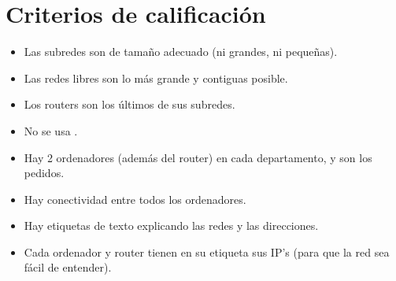 \section{Criterios de calificación}
\begin{itemize}
\item Las subredes son de tamaño adecuado (ni grandes, ni pequeñas).
\item Las redes libres son lo más grande y contiguas posible.
\item Los routers son los últimos de sus subredes.
\item No se usa \texttt{}.
\item Hay 2 ordenadores (además del router) en cada departamento, y son los pedidos.
\item Hay conectividad entre todos los ordenadores.
\item Hay etiquetas de texto explicando las redes y las direcciones.
\item Cada ordenador y router tienen en su etiqueta sus IP’s (para que la red sea fácil de entender).
\end{itemize}


